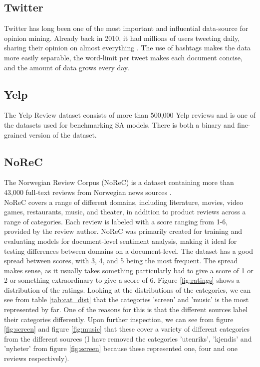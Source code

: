 \subsection{Twitter}
Twitter has long been one of the most important and influential data-source for opinion mining. Already back in 2010, it had millions of users tweeting daily, sharing their opinion on almost everything \cite{pak-paroubek-2010-twitter}. The use of hashtags makes the data more easily separable, the word-limit per tweet makes each document concise, and the amount of data grows every day.
\subsection{Yelp} 
The Yelp Review dataset \cite{zhang2016characterlevel} consists of more than 500,000 Yelp reviews and is one of the datasets used for benchmarking SA models. There is both a binary and fine-grained version of the dataset.


\subsection{NoReC}
The Norwegian Review Corpus (NoReC) is a dataset containing more than 43,000 full-text reviews from Norwegian news sources \cite{VelOvrBer18}.\\
NoReC covers a range of different domains, including literature, movies, video games, restaurants, music, and theater, in addition to product reviews across a range of categories. Each review is labeled with a score ranging from 1-6, provided by the review author. NoReC was primarily created for training and evaluating models for document-level sentiment analysis, making it ideal for testing differences between domains on a document-level. The dataset has a good spread between scores, with 3, 4, and 5 being the most frequent. The spread makes sense, as it usually takes something particularly bad to give a score of 1 or 2 or something extraordinary to give a score of 6. Figure \ref{fig:ratings} shows a distribution of the ratings. Looking at the distributions of the categories, we can see from table \ref{tab:cat_dist} that the categories 'screen' and 'music' is the most represented by far. One of the reasons for this is that the different sources label their categories differently. Upon further inspection, we can see from figure \ref{fig:screen} and figure \ref{fig:music} that these cover a variety of different categories from the different sources (I have removed the categories 'utenriks', 'kjendis' and 'nyheter' from figure \ref{fig:screen} because these represented one, four and one reviews respectively).

